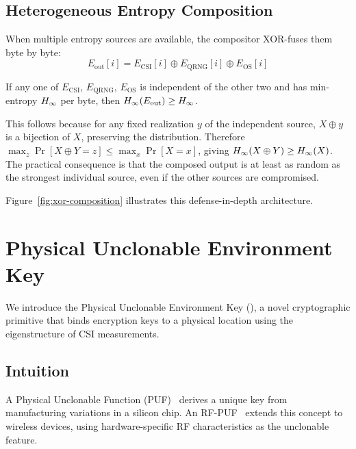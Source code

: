 \subsection{Heterogeneous Entropy Composition}
\label{subsec:compositor}

When multiple entropy sources are available, the compositor XOR-fuses them byte by byte:
\begin{equation}
E_{\text{out}}[i] = E_{\text{CSI}}[i] \oplus E_{\text{QRNG}}[i] \oplus E_{\text{OS}}[i]
\label{eq:xor-composition}
\end{equation}

\begin{lemma}
\label{lem:xor}
If any one of $E_{\text{CSI}}$, $E_{\text{QRNG}}$, $E_{\text{OS}}$ is independent of the other two and has min-entropy $H_{\infty}$ per byte, then $H_{\infty}(E_{\text{out}}) \geq H_{\infty}$.
\end{lemma}

This follows because for any fixed realization $y$ of the independent source, $X \oplus y$ is a bijection of $X$, preserving the distribution.
Therefore $\max_z \Pr[X \oplus Y = z] \leq \max_x \Pr[X = x]$, giving $H_{\infty}(X \oplus Y) \geq H_{\infty}(X)$.
The practical consequence is that the composed output is at least as random as the strongest individual source, even if the other sources are compromised.


Figure~\ref{fig:xor-composition} illustrates this defense-in-depth architecture.




\section{Physical Unclonable Environment Key}
\label{sec:puek}

We introduce the Physical Unclonable Environment Key (\puek), a novel cryptographic primitive that binds encryption keys to a physical location using the eigenstructure of CSI measurements.

\subsection{Intuition}
\label{subsec:puek-intuition}

A Physical Unclonable Function (PUF)~\cite{suh2007puf} derives a unique key from manufacturing variations in a silicon chip.
An RF-PUF~\cite{chatterjee2019rfpuf} extends this concept to wireless devices, using hardware-specific RF characteristics as the unclonable feature.

